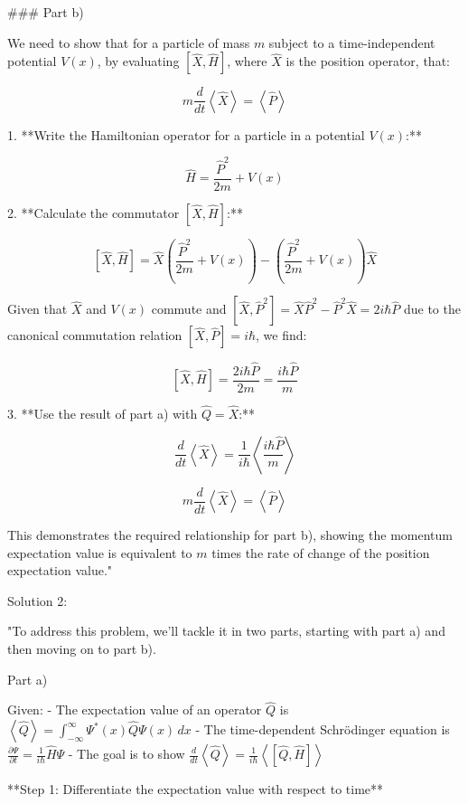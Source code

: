 ### Part b)

We need to show that for a particle of mass \( m \) subject to a time-independent potential \( V(x) \), by evaluating \( \left[ \hat{X}, \hat{H}\right] \), where \( \hat{X} \) is the position operator, that:

\[ m\frac{d}{dt}\left<\hat{X}\right> = \left<\hat{P}\right> \]

1. **Write the Hamiltonian operator for a particle in a potential \( V(x) \):**

\[ \hat{H} = \frac{\hat{P}^2}{2m} + V(x) \]

2. **Calculate the commutator \( \left[ \hat{X}, \hat{H}\right] \):**

\[ \left[ \hat{X}, \hat{H}\right] = \hat{X}\left(\frac{\hat{P}^2}{2m} + V(x)\right) - \left(\frac{\hat{P}^2}{2m} + V(x)\right)\hat{X} \]

Given that \( \hat{X} \) and \( V(x) \) commute and \( \left[ \hat{X}, \hat{P}^2 \right] = \hat{X}\hat{P}^2 - \hat{P}^2\hat{X} = 2i\hbar\hat{P} \) due to the canonical commutation relation \( \left[ \hat{X}, \hat{P} \right] = i\hbar \), we find:

\[ \left[ \hat{X}, \hat{H}\right] = \frac{2i\hbar\hat{P}}{2m} = \frac{i\hbar\hat{P}}{m} \]

3. **Use the result of part a) with \( \hat{Q} = \hat{X} \):**

\[ \frac{d}{dt}\left<\hat{X}\right> = \frac{1}{i\hbar}\left< \frac{i\hbar\hat{P}}{m} \right> \]

\[ m\frac{d}{dt}\left<\hat{X}\right> = \left<\hat{P}\right> \]

This demonstrates the required relationship for part b), showing the momentum expectation value is equivalent to \( m \) times the rate of change of the position expectation value."

Solution 2:

"To address this problem, we'll tackle it in two parts, starting with part a) and then moving on to part b).

Part a)

Given:
- The expectation value of an operator \( \hat{Q} \) is \( \left< \hat{Q} \right> = \int_{-\infty}^{\infty} \Psi^{*}(x) \hat{Q} \Psi(x) \, dx \)
- The time-dependent Schrödinger equation is \( \frac{\partial\Psi}{\partial t} = \frac{1}{i\hbar}\hat{H}\Psi \)
- The goal is to show \( \frac{d}{dt}\left<\hat{Q}\right> = \frac{1}{i\hbar}\left< \left[ \hat{Q}, \hat{H} \right] \right> \)

**Step 1: Differentiate the expectation value with respect to time**

